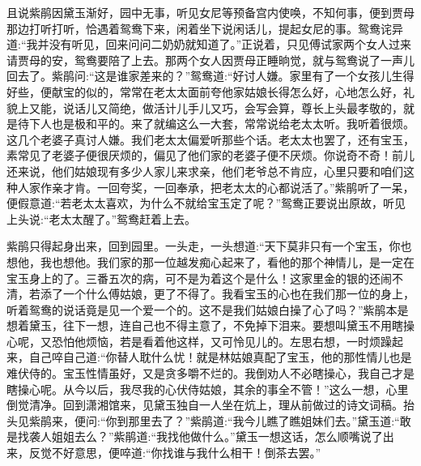 \begin{parag}
    且说紫鹃因黛玉渐好，园中无事，听见女尼等预备宫内使唤，不知何事，便到贾母那边打听打听，恰遇着鸳鸯下来，闲着坐下说闲话儿，提起女尼的事。鸳鸯诧异道:“我并没有听见，回来问问二奶奶就知道了。”正说着，只见傅试家两个女人过来请贾母的安，鸳鸯要陪了上去。那两个女人因贾母正睡晌觉，就与鸳鸯说了一声儿回去了。紫鹃问:“这是谁家差来的？”鸳鸯道:“好讨人嫌。家里有了一个女孩儿生得好些，便献宝的似的，常常在老太太面前夸他家姑娘长得怎么好，心地怎么好，礼貌上又能，说话儿又简绝，做活计儿手儿又巧，会写会算，尊长上头最孝敬的，就是待下人也是极和平的。来了就编这么一大套，常常说给老太太听。我听着很烦。这几个老婆子真讨人嫌。我们老太太偏爱听那些个话。老太太也罢了，还有宝玉，素常见了老婆子便很厌烦的，偏见了他们家的老婆子便不厌烦。你说奇不奇！前儿还来说，他们姑娘现有多少人家儿来求亲，他们老爷总不肯应，心里只要和咱们这种人家作亲才肯。一回夸奖，一回奉承，把老太太的心都说活了。”紫鹃听了一呆，便假意道:“若老太太喜欢，为什么不就给宝玉定了呢？”鸳鸯正要说出原故，听见上头说:“老太太醒了。”鸳鸯赶着上去。
\end{parag}


\begin{parag}
    紫鹃只得起身出来，回到园里。一头走，一头想道:“天下莫非只有一个宝玉，你也想他，我也想他。我们家的那一位越发痴心起来了，看他的那个神情儿，是一定在宝玉身上的了。三番五次的病，可不是为着这个是什么！这家里金的银的还闹不清，若添了一个什么傅姑娘，更了不得了。我看宝玉的心也在我们那一位的身上，听着鸳鸯的说话竟是见一个爱一个的。这不是我们姑娘白操了心了吗？”紫鹃本是想着黛玉，往下一想，连自己也不得主意了，不免掉下泪来。要想叫黛玉不用瞎操心呢，又恐怕他烦恼，若是看着他这样，又可怜见儿的。左思右想，一时烦躁起来，自己啐自己道:“你替人耽什么忧！就是林姑娘真配了宝玉，他的那性情儿也是难伏侍的。宝玉性情虽好，又是贪多嚼不烂的。我倒劝人不必瞎操心，我自己才是瞎操心呢。从今以后，我尽我的心伏侍姑娘，其余的事全不管！”这么一想，心里倒觉清净。回到潇湘馆来，见黛玉独自一人坐在炕上，理从前做过的诗文词稿。抬头见紫鹃来，便问:“你到那里去了？”紫鹃道:“我今儿瞧了瞧姐妹们去。”黛玉道:“敢是找袭人姐姐去么？”紫鹃道:“我找他做什么。”黛玉一想这话，怎么顺嘴说了出来，反觉不好意思，便啐道:“你找谁与我什么相干！倒茶去罢。”
\end{parag}


